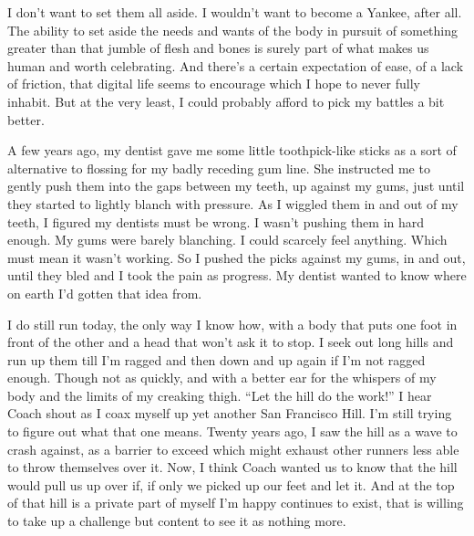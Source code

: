 \documentclass[12pt, oneside]{memoir}
\begin{document}
I don't want to set them all aside.
I wouldn't want to become a Yankee, after all.
The ability to set aside the needs and wants of the body in pursuit of
something greater than that jumble of flesh and bones is surely part
of what makes us human and worth celebrating.
And there's a certain expectation of ease, of a lack of friction, that
digital life seems to encourage which I hope to never fully inhabit.
But at the very least, I could probably afford to pick my battles a
bit better.

A few years ago, my dentist gave me some little toothpick-like sticks
as a sort of alternative to flossing for my badly receding gum line.
She instructed me to gently push them into the gaps between my teeth,
up against my gums, just until they started to lightly blanch with
pressure.
As I wiggled them in and out of my teeth, I figured my dentists must
be wrong.
I wasn't pushing them in hard enough.
My gums were barely blanching.
I could scarcely feel anything.
Which must mean it wasn't working.
So I pushed the picks against my gums, in and out, until they bled and
I took the pain as progress.
My dentist wanted to know where on earth I'd gotten that idea from.

I do still run today, the only way I know how, with a body that puts
one foot in front of the other and a head that won't ask it to stop.
I seek out long hills and run up them till I'm ragged and then
down and up again if I'm not ragged enough.
Though not as quickly, and with a better ear for the whispers of my
body and the limits of my creaking thigh.
``Let the hill do the work!'' I hear Coach shout as I coax myself up
yet another San Francisco Hill.
I'm still trying to figure out what that one means.
Twenty years ago, I saw the hill as a wave to crash against, as a
barrier to exceed which might exhaust other runners less able to throw
themselves over it.
Now, I think Coach wanted us to know that the hill would pull us up
over if, if only we picked up our feet and let it.
And at the top of that hill is a private part of myself I'm happy
continues to exist, that is willing to take up a challenge but content
to see it as nothing more.
\end{document}
